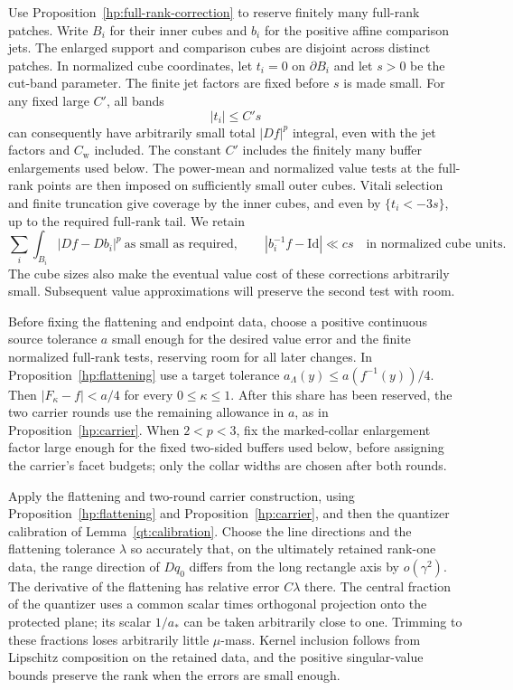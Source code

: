 Use Proposition~\ref{hp:full-rank-correction} to reserve finitely many
full-rank patches.  Write $B_i$ for their inner cubes and $b_i$ for
the positive affine comparison jets.  The enlarged support and
comparison cubes are disjoint across distinct patches.
In normalized cube coordinates,
let $t_i=0$ on $\partial B_i$ and let $s>0$ be the cut-band parameter.
The finite jet factors are fixed before $s$ is made small.  For any
fixed large $C'$, all bands
\begin{equation}\label{ha:full-bands}
                         |t_i|\le C's
\end{equation}
can consequently have arbitrarily small total $|Df|^p$ integral,
even with the jet factors and $C_{\mathrm w}$ included.  The constant
$C'$ includes the finitely many buffer enlargements used below.
The power-mean and normalized value tests at the full-rank points
are then imposed on sufficiently small outer cubes.  Vitali selection
and finite truncation give coverage by the inner cubes, and even by
$\{t_i<-3s\}$, up to the required full-rank tail.  We retain
\begin{equation}\label{ha:affine-full-tests}
 \sum_i\int_{B_i}|Df-Db_i|^p\ \text{as small as required},
 \qquad
 |b_i^{-1}f-\mathrm{Id}|\ll cs
 \quad\text{in normalized cube units}.
\end{equation}
The cube sizes also make the eventual value cost of these corrections
arbitrarily small.  Subsequent value approximations will preserve
the second test with room.

Before fixing the flattening and endpoint data, choose a positive
continuous source tolerance $a$ small enough for the desired value
error and the finite normalized full-rank tests, reserving room for
all later changes.  In Proposition~\ref{hp:flattening} use a target
tolerance $a_\Lambda(y)\le a(f^{-1}(y))/4$.  Then
$|F_\kappa-f|<a/4$ for every $0\le\kappa\le1$.  After this share
has been reserved, the two carrier rounds use the remaining
allowance in $a$, as in Proposition~\ref{hp:carrier}.
When $2<p<3$, fix the marked-collar enlargement factor large enough
for the fixed two-sided buffers used below, before assigning the
carrier's facet budgets; only the collar widths are chosen after
both rounds.

Apply the flattening and two-round carrier construction, using
Proposition~\ref{hp:flattening} and Proposition~\ref{hp:carrier}, and then
the quantizer calibration of Lemma~\ref{qt:calibration}.
Choose the line directions and the flattening tolerance $\lambda$
so accurately that, on the ultimately retained rank-one data, the
range direction of $Dq_0$ differs from the long rectangle axis by
$o(\gamma^2)$.  The derivative of the flattening has relative error
$C\lambda$ there.  The central fraction of the quantizer uses a common
scalar times orthogonal projection onto the protected plane; its
scalar $1/a_*$ can be taken arbitrarily close to one.  Trimming to
these fractions loses arbitrarily little $\mu$-mass.  Kernel inclusion
follows from Lipschitz composition on the retained data, and the
positive singular-value bounds preserve the rank when the errors are
small enough.

